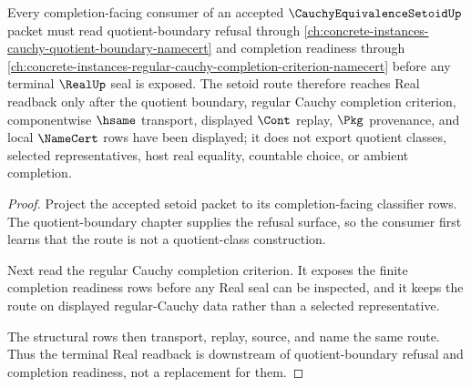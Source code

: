 \begin{theorem}
\label{thm:cauchy-equivalence-setoid-quotient-boundary-completion-route}
Every completion-facing consumer of an accepted $\CauchyEquivalenceSetoidUp$ packet must read quotient-boundary refusal through \autoref{ch:concrete-instances-cauchy-quotient-boundary-namecert} and completion readiness through \autoref{ch:concrete-instances-regular-cauchy-completion-criterion-namecert} before any terminal $\RealUp$ seal is exposed. The setoid route therefore reaches Real readback only after the quotient boundary, regular Cauchy completion criterion, componentwise $\hsame$ transport, displayed $\Cont$ replay, $\Pkg$ provenance, and local $\NameCert$ rows have been displayed; it does not export quotient classes, selected representatives, host real equality, countable choice, or ambient completion.
\end{theorem}
\begin{proof}
Project the accepted setoid packet to its completion-facing classifier rows. The quotient-boundary chapter supplies the refusal surface, so the consumer first learns that the route is not a quotient-class construction.

Next read the regular Cauchy completion criterion. It exposes the finite completion readiness rows before any Real seal can be inspected, and it keeps the route on displayed regular-Cauchy data rather than a selected representative.

The structural rows then transport, replay, source, and name the same route. Thus the terminal Real readback is downstream of quotient-boundary refusal and completion readiness, not a replacement for them.
\end{proof}
